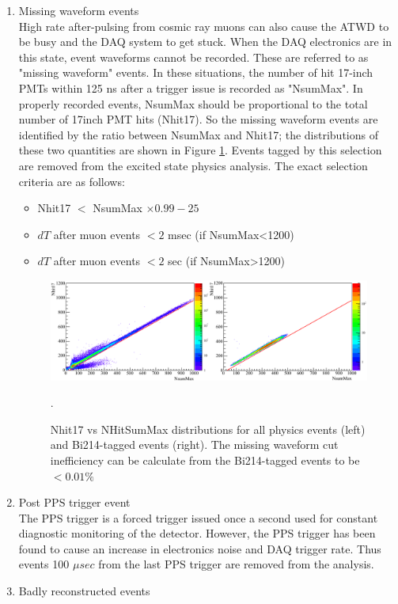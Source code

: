 \begin{enumerate}
	\item Missing waveform events \\
	High rate after-pulsing from cosmic ray muons can also cause the ATWD to be busy and the DAQ system to get stuck. When the DAQ electronics are in this state, event waveforms cannot be recorded. These are referred to as "missing waveform" events. In these situations, the number of hit 17-inch PMTs within 125 ns after a trigger issue is recorded as "NsumMax". In properly recorded events, NsumMax should be proportional to the total number of 17inch PMT hits (Nhit17). So the missing waveform events are identified by the ratio between NsumMax and Nhit17; the distributions of these two quantities are shown in Figure \ref{fig:missing_waveform}. Events tagged by this selection are removed from the excited state physics analysis. The exact selection criteria are as follows:
	\begin{itemize}
		\item Nhit17 $<$ NsumMax $\times 0.99-25$
		\item $dT$ after muon events $< 2$ msec (if NsumMax<1200)
		\item $dT$ after muon events $< 2$ sec (if NsumMax>1200)
	\end{itemize}
	\begin{figure}[htb]
		\centering
        \includegraphics[scale=0.45]{missing_waveform.png}
        \caption{Nhit17 vs NHitSumMax distributions for all physics events (left) and Bi214-tagged events (right). The missing waveform cut inefficiency can be calculate from the Bi214-tagged events to be $< 0.01\%$}.
        \label{fig:missing_waveform}
	\end{figure}
	\item Post PPS trigger event \\
	The PPS trigger is a forced trigger issued once a second used for constant diagnostic monitoring of the detector. However, the PPS trigger has been found to cause an increase in electronics noise and DAQ trigger rate. Thus events 100 $\mu sec$ from the last PPS trigger are removed from the analysis.
	\item Badly reconstructed events \\

\end{enumerate}
